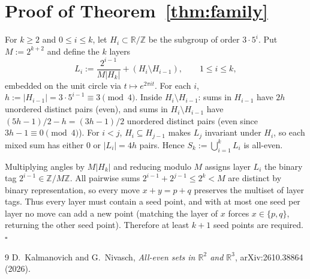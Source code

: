 \documentclass[11pt]{article}
\begin{document}
\section{Proof of Theorem~\ref{thm:family}}

For $k \ge 2$ and $0 \le i \le k$, let $H_i \subset \mathbb{R}/\mathbb{Z}$ be the subgroup of order $3 \cdot 5^i$. Put $M := 2^{k+2}$ and define the $k$ layers
\[
L_i := \frac{2^{i-1}}{M |H_k|} + (H_i \setminus H_{i-1}), \qquad 1 \le i \le k,
\]
embedded on the unit circle via $t \mapsto e^{2\pi i t}$. For each $i$, $h := |H_{i-1}| = 3 \cdot 5^{i-1} \equiv 3 \pmod 4$. Inside $H_i \setminus H_{i-1}$: sums in $H_{i-1}$ have $2h$ unordered distinct pairs (even), and sums in $H_i \setminus H_{i-1}$ have $(5h - 1)/2 - h = (3h - 1)/2$ unordered distinct pairs (even since $3h - 1 \equiv 0 \pmod 4$). For $i < j$, $H_i \subseteq H_{j-1}$ makes $L_j$ invariant under $H_i$, so each mixed sum has either $0$ or $|L_i| = 4h$ pairs. Hence $S_k := \bigcup_{i=1}^k L_i$ is all-even.

Multiplying angles by $M|H_k|$ and reducing modulo $M$ assigns layer $L_i$ the binary tag $2^{i-1} \in \mathbb{Z}/M\mathbb{Z}$. All pairwise sums $2^{i-1} + 2^{j-1} \le 2^k < M$ are distinct by binary representation, so every move $x + y = p + q$ preserves the multiset of layer tags. Thus every layer must contain a seed point, and with at most one seed per layer no move can add a new point (matching the layer of $x$ forces $x \in \{p, q\}$, returning the other seed point). Therefore at least $k + 1$ seed points are required. \hfill$\square$

\begin{thebibliography}{9}
D.~Kalmanovich and G.~Nivasch,
\emph{All-even sets in $\mathbb{R}^2$ and $\mathbb{R}^3$},
arXiv:2610.38864 (2026).
\end{thebibliography}
\end{document}
